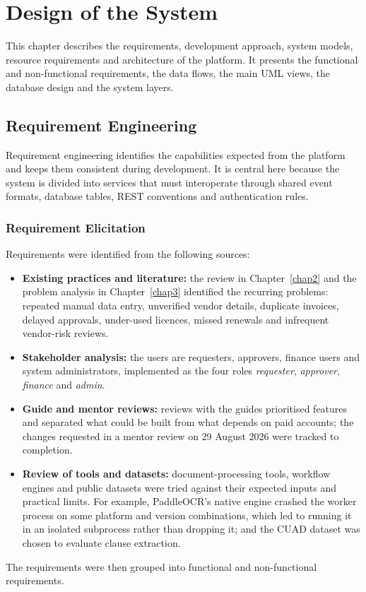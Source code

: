 
\chapter{Design of the System} \label{chap4}
\newpage

This chapter describes the requirements, development approach, system models, resource requirements and architecture of the platform. It presents the functional and non-functional requirements, the data flows, the main UML views, the database design and the system layers.

\section{Requirement Engineering}
Requirement engineering identifies the capabilities expected from the platform and keeps them consistent during development. It is central here because the system is divided into services that must interoperate through shared event formats, database tables, REST conventions and authentication rules.

\subsection{Requirement Elicitation}
Requirements were identified from the following sources:
\begin{itemize}
  \item \textbf{Existing practices and literature:} the review in Chapter~\ref{chap2} and the problem analysis in Chapter~\ref{chap3} identified the recurring problems: repeated manual data entry, unverified vendor details, duplicate invoices, delayed approvals, under-used licences, missed renewals and infrequent vendor-risk reviews.
  \item \textbf{Stakeholder analysis:} the users are requesters, approvers, finance users and system administrators, implemented as the four roles \emph{requester}, \emph{approver}, \emph{finance} and \emph{admin}.
  \item \textbf{Guide and mentor reviews:} reviews with the guides prioritised features and separated what could be built from what depends on paid accounts; the changes requested in a mentor review on 29 August 2026 were tracked to completion.
  \item \textbf{Review of tools and datasets:} document-processing tools, workflow engines and public datasets were tried against their expected inputs and practical limits. For example, PaddleOCR's native engine crashed the worker process on some platform and version combinations, which led to running it in an isolated subprocess rather than dropping it; and the CUAD dataset was chosen to evaluate clause extraction.
\end{itemize}
The requirements were then grouped into functional and non-functional requirements.

